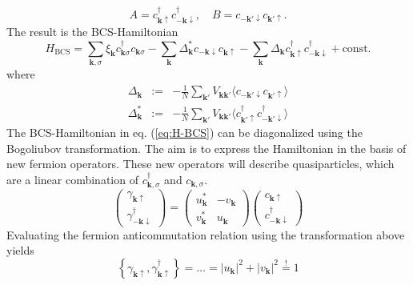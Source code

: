 \begin{equation}
A = c^{\dagger}_{\mathbf{k} \uparrow }c^{\dagger}_{- \mathbf{k} \downarrow}, \quad B =  c_{- \mathbf{k'} \downarrow} c_{\mathbf{k'} \uparrow} .
\end{equation}
The result is the BCS-Hamiltonian
\begin{equation}
H_{\text{BCS}} = \sum_{\mathbf{k}, \sigma} \xi_{\mathbf{k}} c^{\dagger}_{\mathbf{k} \sigma }c_{\mathbf{k} \sigma }    -  \sum_{\mathbf{k}} \Delta_{\mathbf{k}}^* c_{-\mathbf{k} \downarrow} c_{\mathbf{k} \uparrow}  - \sum_{\mathbf{k}} \Delta_{\mathbf{k}}  c^{\dagger}_{\mathbf{k} \uparrow} c^{\dagger}_{- \mathbf{k} \downarrow} + \text{const.}\label{eq:H-BCS}
\end{equation}
where 
\begin{eqnarray}
\Delta_{\mathbf{k}} &:=& - \frac{1}{N} \sum_{\mathbf{k'}} V_\mathbf{{\mathbf{k} \mathbf{k'}}} \langle c_{-\mathbf{k'} \downarrow} c_{\mathbf{k'} \uparrow} \rangle \\
\Delta_{\mathbf{k}}^* &:=& - \frac{1}{N} \sum_{\mathbf{k'}} V_\mathbf{{\mathbf{k} \mathbf{k'}}}  \langle  c^{\dagger}_{\mathbf{k'} \uparrow} c^{\dagger}_{- \mathbf{k'} \downarrow} \rangle
\end{eqnarray}
The BCS-Hamiltonian in eq. (\ref{eq:H-BCS}) can be diagonalized using the Bogoliubov transformation. The aim is to express the Hamiltonian in the basis of new fermion operators. These new operators will describe quasiparticles, which are a linear combination of $c^\dagger_{\mathbf{k}, \sigma}$ and $c_{\mathbf{k}, \sigma}$.
\begin{equation}
\begin{pmatrix}
\gamma_{\mathbf{k} \uparrow} \\ \gamma^{\dagger}_{-\mathbf{k} \downarrow}  
\end{pmatrix} = \begin{pmatrix}
u^*_{\mathbf{k} } & -v_{\mathbf{k} } \\
v^*_{\mathbf{k} }  & u_{\mathbf{k} } 
\end{pmatrix} 
\begin{pmatrix}
c_{\mathbf{k} \uparrow} \\ c^{\dagger}_{-\mathbf{k} \downarrow}  
\end{pmatrix}
\end{equation}\label{eq:bogol-trans}
Evaluating the fermion anticommutation relation using the transformation above yields
\begin{equation}
\left\{ \gamma_{\mathbf{k} \uparrow}, \gamma^{\dagger}_{\mathbf{k} \uparrow}  \right\}  = \dots = |u_{\mathbf{k}}|^2  + |v_{\mathbf{k}}|^2 \stackrel{!}{=} 1
\end{equation}
